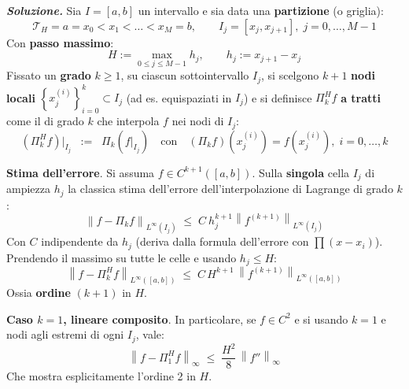 \begin{itemize}
    \textcolor{Green3}{ \textbf{\emph{Soluzione.}}}  Sia $I = \left[a,b\right]$ un intervallo e sia data una \textbf{partizione} (o griglia):
    \begin{equation*}
        \mathcal T_H={a=x_0<x_1<\dots<x_M=b}, \qquad I_j=[x_j,x_{j+1}],\; j=0,\dots,M-1
    \end{equation*}
    Con \textbf{passo massimo}:
    \begin{equation*}
        H:=\max_{0\le j\le M-1} h_j, \qquad h_j:=x_{j+1}-x_j
    \end{equation*}
    Fissato un \textbf{grado} $k \ge 1$, su ciascun sottointervallo $I_{j}$, si scelgono $k+1$ \textbf{nodi locali} $\left\{x^{(i)}_j\right\}_{i=0}^k\subset I_j$ (ad es. equispaziati in $I_{j}$) e si definisce $\Pi_{k}^{H} f$ \textbf{a tratti} come il  di grado $k$ che interpola $f$ nei nodi di $I_{j}$:
    \begin{equation*}
        \left(\Pi_k^H f\right)|_{I_j} \;\; := \;\; \Pi_k\left(f|_{I_j}\right)
        \quad\text{con}\quad
        \left(\Pi_k f\right)\left(x^{(i)}_j\right)=f\left(x^{(i)}_j\right),\; i=0,\dots,k
    \end{equation*}

    \textbf{Stima dell'errore}. Si assuma $f \in C^{k+1}\left(\left[a,b\right]\right)$. Sulla \textbf{singola} cella $I_{j}$ di ampiezza $h_{j}$ la classica stima dell'errore dell'interpolazione di Lagrange di grado $k$:
    \begin{equation*}
        \left\| f - \Pi_{k} f \right\|_{L^\infty \left(I_j\right)} \; \le \; C \: h_{j}^{k+1} \left\| f^{\left(k+1\right)} \right\|_{L^{\infty} \left(I_{j}\right)}
    \end{equation*}
    Con $C$ indipendente da $h_{j}$ (deriva dalla formula dell'errore con $\prod \left(x-x_{i}\right)$). Prendendo il massimo su tutte le celle e usando $h_{j} \le H$:
    \begin{equation*}
        \left\| f - \Pi_{k}^{H} f \right\|_{L^{\infty}\left(\left[a,b\right]\right)} \; \le \;
        C \, H^{k+1} \, \left\| f^{\left(k+1\right)} \right\|_{L^{\infty}\left(\left[a,b\right]\right)}
    \end{equation*}
    Ossia \textbf{ordine} $\left(k+1\right)$ in $H$.

    \textbf{Caso $k=1$, lineare composito}. In particolare, se $f \in C^{2}$ e si usando $k=1$ e nodi agli estremi di ogni $I_{j}$, vale:
    \begin{equation*}
        \left\| f - \Pi_{1}^{H} f \right\|_{\infty} \; \le \; \dfrac{H^{2}}{8} \, \left\| f'' \right\|_{\infty}
    \end{equation*}
    Che mostra esplicitamente l'ordine 2 in $H$.


\end{itemize}
